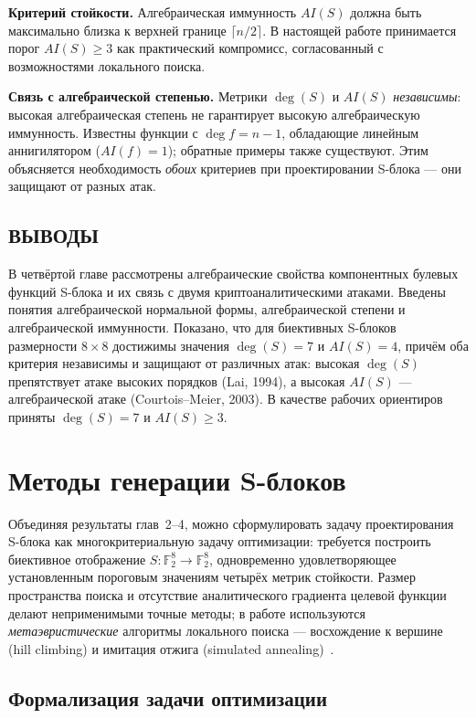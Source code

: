 \textbf{Критерий стойкости.} Алгебраическая иммунность $AI(S)$ должна
быть максимально близка к верхней границе $\lceil n/2 \rceil$.
В настоящей работе принимается порог $AI(S) \geq 3$ как практический
компромисс, согласованный с возможностями локального поиска.

\medskip
\textbf{Связь с алгебраической степенью.} Метрики $\deg(S)$ и $AI(S)$
\emph{независимы}: высокая алгебраическая степень не гарантирует
высокую алгебраическую иммунность. Известны функции с
$\deg f = n - 1$, обладающие линейным аннигилятором ($AI(f) = 1$);
обратные примеры также существуют. Этим объясняется необходимость
\emph{обоих} критериев при проектировании S-блока — они защищают от
разных атак.

\subsection*{ВЫВОДЫ}

В четвёртой главе рассмотрены алгебраические свойства компонентных
булевых функций S-блока и их связь с двумя криптоаналитическими
атаками. Введены понятия алгебраической нормальной формы,
алгебраической степени и алгебраической иммунности. Показано, что для
биективных S-блоков размерности $8 \times 8$ достижимы значения
$\deg(S) = 7$ и $AI(S) = 4$, причём оба критерия независимы и
защищают от различных атак: высокая $\deg(S)$ препятствует атаке
высоких порядков (Lai, 1994), а высокая $AI(S)$ — алгебраической атаке
(Courtois–Meier, 2003). В качестве рабочих ориентиров приняты
$\deg(S) = 7$ и $AI(S) \geq 3$.


\newpage
\section{Методы генерации S-блоков}

Объединяя результаты глав~2–4, можно сформулировать задачу
проектирования S-блока как многокритериальную задачу оптимизации:
требуется построить биективное отображение $S: \mathbb{F}_2^8 \to \mathbb{F}_2^8$,
одновременно удовлетворяющее установленным пороговым значениям
четырёх метрик стойкости. Размер пространства поиска и отсутствие
аналитического градиента целевой функции делают неприменимыми
точные методы; в работе используются \emph{метаэвристические}
алгоритмы локального поиска — восхождение к вершине (hill climbing)
и имитация отжига (simulated annealing)~\cite{kirkpatrick1983sa}.

\subsection{Формализация задачи оптимизации}

